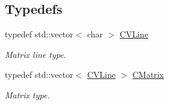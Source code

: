 \subsection*{Typedefs}
\begin{DoxyCompactItemize}
\item 
\hypertarget{namespace_chase_game_aa09cf1806d3b1f59d36cfabadeaca6a2}{typedef std\-::vector$<$ char $>$ \hyperlink{namespace_chase_game_aa09cf1806d3b1f59d36cfabadeaca6a2}{C\-V\-Line}}\label{namespace_chase_game_aa09cf1806d3b1f59d36cfabadeaca6a2}

\begin{DoxyCompactList}\small\item\em Matrix line type. \end{DoxyCompactList}\item 
\hypertarget{namespace_chase_game_a469449f9237e59efce3982127366c550}{typedef std\-::vector$<$ \hyperlink{namespace_chase_game_aa09cf1806d3b1f59d36cfabadeaca6a2}{C\-V\-Line} $>$ \hyperlink{namespace_chase_game_a469449f9237e59efce3982127366c550}{C\-Matrix}}\label{namespace_chase_game_a469449f9237e59efce3982127366c550}

\begin{DoxyCompactList}\small\item\em Matrix type. \end{DoxyCompactList}\end{DoxyCompactItemize}
